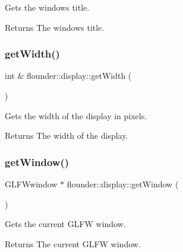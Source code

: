 Gets the window\textquotesingle{}s title. 

\begin{DoxyReturn}{Returns}
The window\textquotesingle{}s title. 
\end{DoxyReturn}
\mbox{\label{classflounder_1_1display_ac2b45bb8c8924b985895f2b08c03c3d9}} 
\subsubsection{\texorpdfstring{get\+Width()}{getWidth()}}
{\footnotesize\ttfamily int \& flounder\+::display\+::get\+Width (\begin{DoxyParamCaption}{ }\end{DoxyParamCaption})}



Gets the width of the display in pixels. 

\begin{DoxyReturn}{Returns}
The width of the display. 
\end{DoxyReturn}
\mbox{\label{classflounder_1_1display_a5cdcd3dddce4cf63ac45503b03e96689}} 
\subsubsection{\texorpdfstring{get\+Window()}{getWindow()}}
{\footnotesize\ttfamily G\+L\+F\+Wwindow $\ast$ flounder\+::display\+::get\+Window (\begin{DoxyParamCaption}{ }\end{DoxyParamCaption})}



Gets the current G\+L\+FW window. 

\begin{DoxyReturn}{Returns}
The current G\+L\+FW window. 
\end{DoxyReturn}
\mbox{\label{classflounder_1_1display_af1d306cb8353a7cdfe7daae4727028fc}} 
